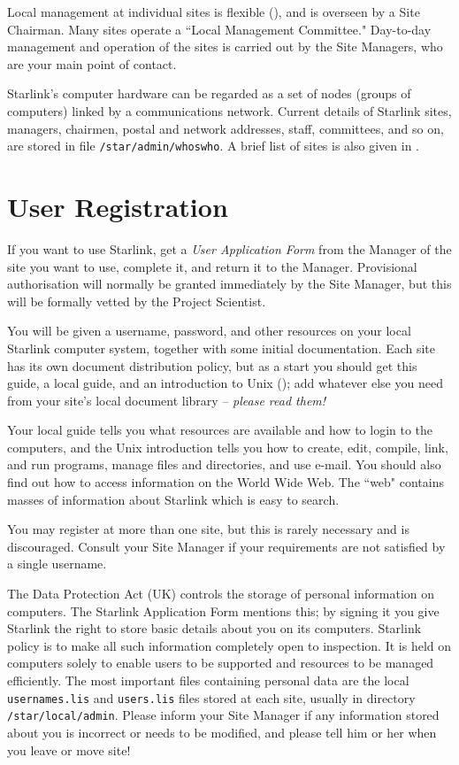 \documentclass[twoside,11pt,nolof]{starlink}
\begin{document}
Local management at individual sites is flexible
(),
and is overseen by a Site Chairman.
Many sites operate a ``Local Management Committee."
Day-to-day management and operation of the sites is carried out by the
Site Managers, who are your main point of contact.

Starlink's computer hardware can be regarded as a set of nodes (groups of
computers) linked by a communications network.
Current details of Starlink sites, managers, chairmen, postal and network
addresses, staff, committees, and so on, are stored in file
\texttt{/star/\-admin/\-whoswho}.
A brief list of sites is also given in
.
\newpage

\section{User Registration}

If you want to use Starlink, get a \emph{User Application Form}\/ from the
Manager of the site you want to use, complete it, and return it to the Manager.
Provisional authorisation will normally be granted immediately by the Site
Manager, but this will be formally vetted by the Project Scientist.

You will be given a username, password, and other resources on your local
Starlink computer system, together with some initial documentation.
Each site has its own document distribution policy, but as a start
you should get this guide, a local guide, and an introduction to Unix
();
add whatever else you need from your site's local document library --
\emph{please read them!}

Your local guide tells you what resources are available and how to login to
the computers, and the Unix introduction tells you how to create, edit,
compile, link, and run programs, manage files and directories, and use e-mail.
You should also find out how to access information on the World Wide Web.
The ``web" contains masses of information about Starlink which is easy to
search.

You may register at more than one site, but this is rarely necessary and
is discouraged.
Consult your Site Manager if your requirements are not satisfied by a single
username.

The Data Protection Act (UK) controls the storage of personal information on
computers.
The Starlink Application Form mentions this; by signing it
you give Starlink the right to store basic details about you on its computers.
Starlink policy is to make all such information completely open to inspection.
It is held on computers solely to enable users to be supported and resources
to be managed efficiently.
The most important files containing personal data are the local
\texttt{usernames.lis} and \texttt{users.lis} files stored at each site,
usually in directory \texttt{/star/local/admin}.
Please inform your Site Manager if any information stored about you is
incorrect or needs to be modified, and please tell him or her when you leave
or move site!
\end{document}
